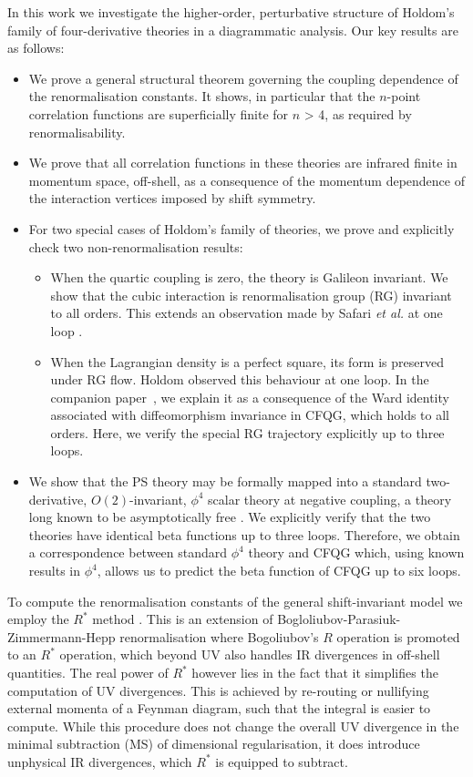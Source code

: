 \documentclass[a4paper,11pt]{article}
\begin{document}
In this work we investigate the higher-order, perturbative structure of Holdom's family of four-derivative theories in a diagrammatic analysis. Our key results are as follows:
\begin{itemize}
\item We prove a general structural theorem governing the coupling dependence of the renormalisation constants. It shows, in particular that the $n$-point correlation functions are superficially finite for $n$ > 4, as required by renormalisability.
    \item We prove that all correlation functions in these theories are infrared finite in momentum space, off-shell, as a consequence of the momentum dependence of the interaction vertices imposed by shift symmetry. 
    \item For two special cases of Holdom's family of theories, we prove and explicitly check two non-renormalisation results:
    \begin{itemize}
        \item When the quartic coupling is zero, the theory is Galileon invariant. We show that the cubic interaction is renormalisation group (RG) invariant to all orders.  This extends an observation made by Safari {\it et al.} at one loop \cite{Safari:2021ocb}. 
        \item When the Lagrangian density is a perfect square, its form is preserved under RG flow. Holdom observed this behaviour at one loop. In the companion paper~\cite{Anderson:2026Rsqaured}, we explain it as a consequence of the Ward identity associated with diffeomorphism invariance in CFQG, which holds to all orders. Here, we verify the special RG trajectory explicitly up to three loops. 
    \end{itemize}
    \item We show that the PS theory may be formally mapped into a standard two-derivative, $O(2)$-invariant, $\phi^4$ scalar theory at negative coupling, a theory long known to be asymptotically free \cite{Symanzik:1973hx}. We explicitly verify that the two theories have identical beta functions up to three loops. Therefore, we obtain a correspondence between standard $\phi^4$ theory and CFQG which, using known results in $\phi^4$, allows us to predict the beta function of CFQG up to six loops. 
\end{itemize}
To compute the renormalisation constants of the general shift-invariant model we employ the $R^*$ method \cite{Chetyrkin:1982nn,Vladimirov:1979zm,
Chetyrkin:1984xa,Smirnov:1985yck,Larin:2002sc,Kleinert:2001hn,Chetyrkin:2017ppe,Herzog:2017bjx,deVries:2019nsu,Beekveldt:2020kzk,Henriksson:2025hwi} . This is an extension of Bogloliubov-Parasiuk-Zimmermann-Hepp renormalisation where Bogoliubov's $R$ operation is promoted to an $R^*$ operation, which beyond UV also handles IR divergences in off-shell quantities. The real power of $R^*$ however lies in the fact that it simplifies the computation of UV divergences. This is achieved by re-routing or nullifying external momenta of a Feynman diagram, such that the integral is easier to compute. While this procedure does not change the overall UV divergence in the minimal subtraction (MS) of dimensional regularisation, it does introduce unphysical IR divergences, which $R^*$ is equipped to subtract. 
\end{document}
